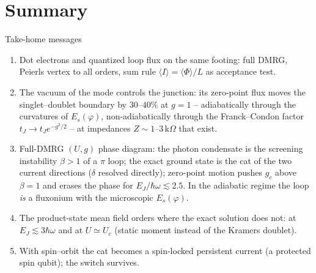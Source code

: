\documentclass[aspectratio=169,9pt]{beamer}
\newcommand{\hw}{\hbar\omega}
\begin{document}
\section{Summary}

\begin{frame}{Take-home messages}
  \begin{enumerate}\small
    \item Dot electrons and quantized loop flux on the same footing: full DMRG, Peierls vertex to all orders,
          sum rule $\langle I\rangle=\langle\Phi\rangle/L$ as acceptance test.
    \item \alert{The vacuum of the mode controls the junction}: its zero-point flux moves the singlet--doublet boundary
          by $30$--$40\%$ at $g=1$ -- adiabatically through the curvatures of $E_s(\varphi)$, non-adiabatically through
          the Franck--Condon factor $t_J\to t_Je^{-g^2/2}$ -- at impedances $Z\sim1$--$3\,$k$\Omega$ that exist.
    \item \alert{Full-DMRG $(U,g)$ phase diagram}: the photon condensate is the screening instability $\beta>1$ of a
          $\pi$ loop; the exact ground state is the cat of the two current directions ($\delta$ resolved directly);
          zero-point motion pushes $g_c$ above $\beta=1$ and erases the phase for $E_J/\hw\lesssim2.5$. In the adiabatic
          regime the loop \emph{is} a fluxonium with the microscopic $E_s(\varphi)$.
    \item The product-state mean field \alert{orders where the exact solution does not}: at $E_J\lesssim3\hw$ and at
          $U\simeq U_c$ (static moment instead of the Kramers doublet).
    \item With spin--orbit the cat becomes a spin-locked persistent current (a protected spin qubit); the switch survives.
  \end{enumerate}
\end{frame}
\end{document}
